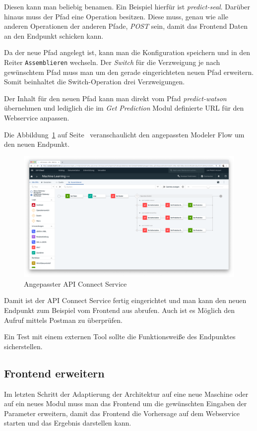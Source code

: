 Diesen kann man beliebig benamen. Ein Beispiel hierfür ist \textit{predict-seal}. Darüber hinaus muss der Pfad eine
Operation besitzen. Diese muss, genau wie alle anderen Operationen der anderen Pfade, \textit{POST} sein, damit das
Frontend Daten an den Endpunkt schicken kann.

Da der neue Pfad angelegt ist, kann man die Konfiguration speichern und in den Reiter \texttt{Assemblieren} wechseln.
Der \textit{Switch} für die Verzweigung je nach gewünschtem Pfad muss man um den gerade eingerichteten neuen Pfad
erweitern. Somit beinhaltet die Switch-Operation drei Verzweigungen.

Der Inhalt für den neuen Pfad kann man direkt vom Pfad \textit{predict-watson} übernehmen und lediglich die im
\textit{Get Prediction} Modul definierte URL für den Webservice anpassen.

Die Abbildung~\ref{fig:siegelmaschinen_apiconnect} auf Seite~\pageref{fig:siegelmaschinen_apiconnect} veranschaulicht
den angepassten Modeler Flow um den neuen Endpunkt.

\begin{figure}[h]
    \centering
    \includegraphics[width=\textwidth]{images/kapitel_5/vffs_apiconnect.png}
    \caption{Angepasster API Connect Service}
    \label{fig:siegelmaschinen_apiconnect}
\end{figure}

Damit ist der API Connect Service fertig eingerichtet und man kann den neuen Endpunkt zum Beispiel vom Frontend aus
abrufen. Auch ist es Möglich den Aufruf mittels Postman zu überprüfen.

Ein Test mit einem externen Tool sollte die Funktionsweiße des Endpunktes sicherstellen.

\subsection{Frontend erweitern}
Im letzten Schritt der Adaptierung der Architektur auf eine neue Maschine oder auf ein neues Modul muss man das Frontend
um die gewünschten Eingaben der Parameter erweitern, damit das Frontend die Vorhersage auf dem Webservice starten und
das Ergebnis darstellen kann.

